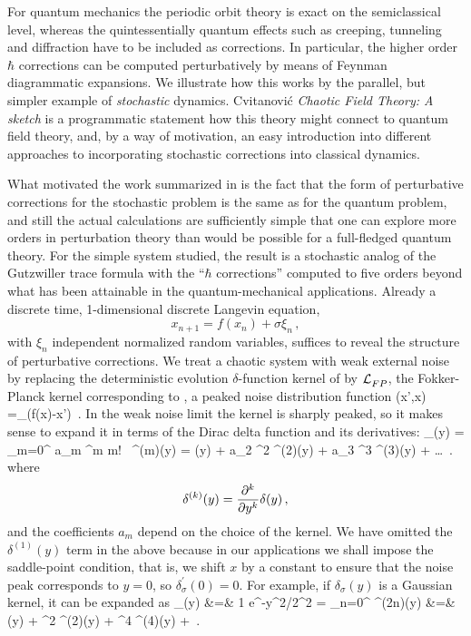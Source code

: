 For quantum mechanics the periodic orbit theory is exact on the
semiclassical level, whereas the quintessentially quantum
effects such as creeping, tunneling and diffraction have to be included
as corrections. In particular, the higher order $\hbar$ corrections can
be computed perturbatively by means of Feynman diagrammatic
expansions.
We illustrate how this works by the parallel, but simpler example of {\em
stochastic} dynamics.
Cvitanovi\'{c} {\em {Chaotic Field Theory}: {A} sketch}
is a programmatic statement how this theory might connect to quantum
field theory, and, by a way of motivation, an easy introduction into
different approaches to incorporating stochastic corrections into
classical dynamics.

What motivated the work
summarized in  is the fact that the form of perturbative
corrections for the stochastic problem  is the same as for the quantum
problem, and still the actual calculations are sufficiently simple that
one can explore more orders in perturbation theory than would be possible
for a full-fledged quantum theory.
For the simple system studied, the result is a stochastic analog of the
Gutzwiller trace formula with  the ``$\hbar$ corrections'' computed to
five orders beyond what has been attainable in the quantum-mechanical
applications. Already a discrete time,
1-dimensional discrete Langevin equation,
\begin{equation}
x_{n+1}=f(x_n)+\sigma\xi_n
\,,\label{Langevin}
\end{equation}
with $\xi_n$ independent normalized random variables, suffices to reveal
the structure of perturbative corrections.
We treat a chaotic system with weak external noise by replacing the
deterministic evolution $\delta$-function kernel of {\FPoper}
 by $\mathcal{L}_{FP}^{}$,  the Fokker-Planck kernel corresponding to
, a peaked noise distribution function
\beq
\Lnoise{}(x',x) =\delta_\sigma(f(x)-x')
\,.
In the weak noise limit the kernel is sharply peaked, so it
makes sense to expand it
in terms of the Dirac delta function and
its derivatives:
\beq
	\delta_\sigma(y)
	=
	\sum_{m=0}^{\infty} {a_m \sigma^m \over m!} \, \delta^{(m)}(y)
	=
	\delta(y) +
	a_2 {\sigma^2 } \delta^{(2)}(y) +
	a_3 {\sigma^3 } \delta^{(3)}(y) + \dots
	\,.
\label{delSigExp}
\eeq
where
\[
	\delta^{(k)}(y) = {\partial^k \over \partial y^k} \delta(y)
	\,,
\]
and the coefficients $a_m$ depend on the choice of the kernel.
We have omitted the $\delta^{(1)}(y)$ term in the above because
in our applications we shall impose
the saddle-point condition, that is,
we shift $x$ by a constant to ensure that the noise peak corresponds
to $y=0$, so $\delta_\sigma^{'}(0)=0$.
For example, if $\delta_\sigma(y)$ is a Gaussian kernel,
it can be expanded as
\bea
	\delta_\sigma(y)
	&=&
	{1 \over {}} e^{-{y^2/2\sigma^2} }
	=
	\sum_{n=0}^{\infty}
	 \delta^{(2n)}(y)
	\continue
	&=&
	\delta(y) + {\sigma^2 } \delta^{(2)}(y)
	 + {\sigma^4 } \delta^{(4)}(y) + \cdots
	\,.
\label{delGaussExp}
\eea





